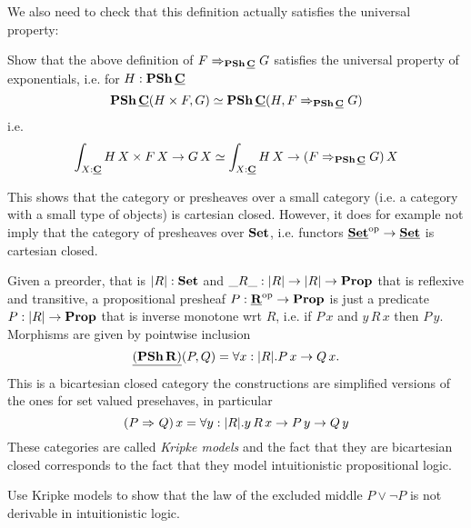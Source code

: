 We also need to check that this definition actually satisfies the universal property:
\begin{Exercise}
  Show that the above definition of $\expC{\PSh\,\cat{C}}{F}{G}$ satisfies the universal property of exponentials, i.e. for $H : \PSh\,\cat{C}$
  \[ \PSh\,\cat{C}(H \times F,G) \simeq \PSh\,\cat{C}(H, \expC{\PSh\,\cat{C}}{F}{G})\]
  i.e.
  \[ \int_{X:\cat{C}}H\,X \times F\,X \to G\,X \simeq
    \int_{X:\cat{C}}H\,X \to (\expC{\PSh\,\cat{C}}{F}{G})\,X\]
\end{Exercise}

This shows that the category or presheaves over a small category (i.e. a category with a small type of objects) is cartesian closed. However, it does for example not imply that the category of presheaves over $\Set$, i.e. functors $\cat{\Set}^\op \to \cat{\Set}$ is cartesian closed. 

Given a preorder, that is $|R|:\Set$ and $\_R\_ : |R| \to |R| \to \Prop$ that is reflexive and transitive, a propositional presheaf $P : \cat{R}^\op \to \Prop$ is just a predicate $P : |R| \to \Prop$ that is inverse monotone wrt $R$, i.e. if $P\,x$ and $y\,R\,x$ then $P\,y$. Morphisms are given by pointwise inclusion 
\[\homC{(\PSh\,R)}{P}{Q} = \forall x:|R|.P\,x \to Q\,x.\]
This is a bicartesian closed category the constructions are simplified versions of the ones for set valued presehaves, in particular 
\[(\expX{P}{Q})\,x = \forall y:|R|.y\,R\,x\to P\,y \to Q\,y \]
These categories are called \emph{Kripke models} and the fact that they are bicartesian closed corresponds to the fact that they model intuitionistic propositional logic.
\begin{Exercise}
  Use Kripke models to show that the law of the excluded middle $P \vee \neg P$ is not derivable in intuitionistic logic. 
\end{Exercise}


